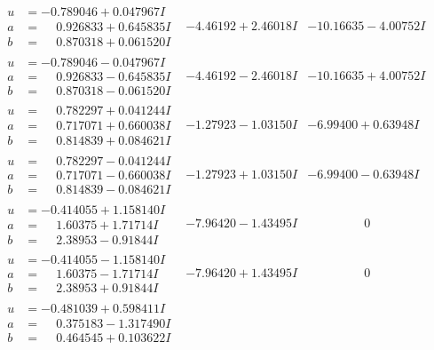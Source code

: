 \documentclass[1p]{elsarticle_modified}
\theoremstyle{definition}
\begin{document}
$$\begin{array}{c|c|c}
\begin{aligned}
u &= -0.789046 + 0.047967 I \\
a &= \phantom{-}0.926833 + 0.645835 I \\
b &= \phantom{-}0.870318 + 0.061520 I\end{aligned}
 & -4.46192 + 2.46018 I & -10.16635 - 4.00752 I \\ \hline\begin{aligned}
u &= -0.789046 - 0.047967 I \\
a &= \phantom{-}0.926833 - 0.645835 I \\
b &= \phantom{-}0.870318 - 0.061520 I\end{aligned}
 & -4.46192 - 2.46018 I & -10.16635 + 4.00752 I \\ \hline\begin{aligned}
u &= \phantom{-}0.782297 + 0.041244 I \\
a &= \phantom{-}0.717071 + 0.660038 I \\
b &= \phantom{-}0.814839 + 0.084621 I\end{aligned}
 & -1.27923 - 1.03150 I & -6.99400 + 0.63948 I \\ \hline\begin{aligned}
u &= \phantom{-}0.782297 - 0.041244 I \\
a &= \phantom{-}0.717071 - 0.660038 I \\
b &= \phantom{-}0.814839 - 0.084621 I\end{aligned}
 & -1.27923 + 1.03150 I & -6.99400 - 0.63948 I \\ \hline\begin{aligned}
u &= -0.414055 + 1.158140 I \\
a &= \phantom{-}1.60375 + 1.71714 I \\
b &= \phantom{-}2.38953 - 0.91844 I\end{aligned}
 & -7.96420 - 1.43495 I & \phantom{-0.000000 } 0 \\ \hline\begin{aligned}
u &= -0.414055 - 1.158140 I \\
a &= \phantom{-}1.60375 - 1.71714 I \\
b &= \phantom{-}2.38953 + 0.91844 I\end{aligned}
 & -7.96420 + 1.43495 I & \phantom{-0.000000 } 0 \\ \hline\begin{aligned}
u &= -0.481039 + 0.598411 I \\
a &= \phantom{-}0.375183 - 1.317490 I \\
b &= \phantom{-}0.464545 + 0.103622 I\end{aligned}

\end{array}$$
\end{document}
